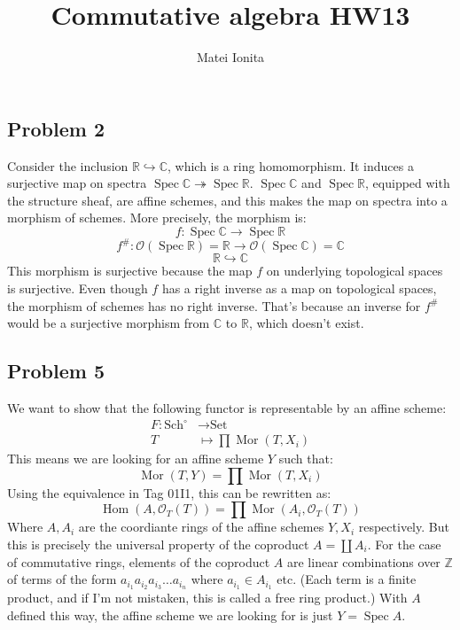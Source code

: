 \documentclass[12 pt]{article}
\title{Commutative algebra HW13}
\author{Matei Ionita}
\newcommand{\R}{\mathbb{R}}
\newcommand{\Z}{\mathbb{Z}}
\newcommand{\C}{\mathbb{C}}
\DeclareMathOperator{\Mor}{Mor}
\DeclareMathOperator{\Hom}{Hom}
\DeclareMathOperator{\Spec}{Spec}
\begin{document}
  \maketitle

\subsection*{Problem 2}
Consider the inclusion $\R \hookrightarrow \C$, which is a ring homomorphism. It induces a surjective map on spectra $\Spec \C \twoheadrightarrow \Spec \R$. $\Spec \C$ and $\Spec \R$, equipped with the structure sheaf, are affine schemes, and this makes the map on spectra into a morphism of schemes. More precisely, the morphism is:
\[       f : \Spec \C \to \Spec \R       \]
\[      f^{\#} : \mathcal{O}(\Spec \R) = \R \to \mathcal{O}(\Spec \C) = \C     \]
\[         \R \hookrightarrow \C    \]
This morphism is surjective because the map $f$ on underlying topological spaces is surjective. Even though $f$ has a right inverse as a map on topological spaces, the morphism of schemes has no right inverse. That's because an inverse for $f^{\#}$ would be a surjective morphism from $\C$ to $\R$, which doesn't exist.

\subsection*{Problem 5}
We want to show that the following functor is representable by an affine scheme:
\begin{align*}
F : \text{Sch}^{\circ} &\to \text{Set} \\
T &\mapsto \prod \Mor (T, X_i)
\end{align*}
This means we are looking for an affine scheme $Y$ such that:
\[       \Mor(T, Y) = \prod \Mor (T, X_i)       \]
Using the equivalence in Tag 01I1, this can be rewritten as:
\[          \Hom (A, \mathcal{O}_T(T)) = \prod \Mor (A_i, \mathcal{O}_T(T))      \]
Where $A, A_i$ are the coordiante rings of the affine schemes $Y, X_i$ respectively. But this is precisely the universal property of the coproduct $A = \coprod A_i$. For the case of commutative rings, elements of the coproduct $A$ are linear combinations over $\Z$ of terms of the form $a_{i_1} a_{i_2} a_{i_3} \dots a_{i_n}$ where $a_{i_1} \in A_{i_1}$ etc. (Each term is a finite product, and if I'm not mistaken, this is called a free ring product.) With $A$ defined this way, the affine scheme we are looking for is just $Y = \Spec A$.
\end{document}
